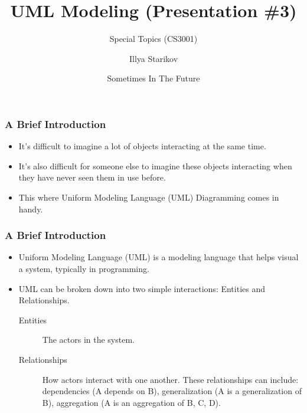 \documentclass[xclolor=dvipsnames]{beamer}            %
\title{UML Modeling (Presentation \#3)}
\subtitle{Special Topics (CS3001)}
\author{Illya Starikov}
\date{Sometimes In The Future}
\institute{Missouri University of Science and Technology}
\begin{document}
\begin{darkframes}
    \maketitle

    \begin{frame}
        \frametitle{A Brief Introduction}

        \begin{itemize}
            \item It's difficult to imagine a lot of objects interacting at the same time.
            \item It's also difficult for someone else to imagine these objects interacting when they have never seen them in use before.
            \item This where Uniform Modeling Language (UML) Diagramming comes in handy.
        \end{itemize}
    \end{frame}

    \begin{frame}
        \frametitle{A Brief Introduction}

        \begin{itemize}
            \item Uniform Modeling Language (UML) is a modeling language that helps visual a system, typically in programming.
            \item UML can be broken down into two simple interactions: Entities and Relationships.
                \begin{description}
                    \item[Entities] The actors in the system.
                    \item[Relationships] How actors interact with one another. These relationships can include: dependencies (A depends on B), generalization (A is a generalization of B), aggregation (A is an aggregation of B, C, D).
                \end{description}
        \end{itemize}
    \end{frame}


\end{darkframes}
\end{document}
